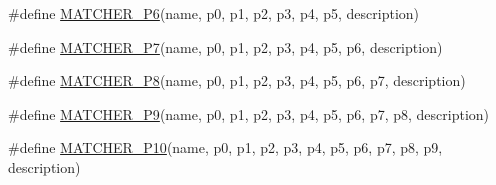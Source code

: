 \begin{DoxyCompactItemize}
\item 
\#define \mbox{\hyperlink{_obj__test_2lib_2googletest-release-1_88_81_2googlemock_2include_2gmock_2gmock-generated-matchers_8h_aceda758bb064965b2b9a7e0e96085861}{M\+A\+T\+C\+H\+E\+R\+\_\+\+P6}}(name,  p0,  p1,  p2,  p3,  p4,  p5,  description)
\item 
\#define \mbox{\hyperlink{_obj__test_2lib_2googletest-release-1_88_81_2googlemock_2include_2gmock_2gmock-generated-matchers_8h_a2948ce54387a83c33fa98ba0c73eb11f}{M\+A\+T\+C\+H\+E\+R\+\_\+\+P7}}(name,  p0,  p1,  p2,  p3,  p4,  p5,  p6,  description)
\item 
\#define \mbox{\hyperlink{_obj__test_2lib_2googletest-release-1_88_81_2googlemock_2include_2gmock_2gmock-generated-matchers_8h_ad86c95b03df37fada38e18d8eb9e53bc}{M\+A\+T\+C\+H\+E\+R\+\_\+\+P8}}(name,  p0,  p1,  p2,  p3,  p4,  p5,  p6,  p7,  description)
\item 
\#define \mbox{\hyperlink{_obj__test_2lib_2googletest-release-1_88_81_2googlemock_2include_2gmock_2gmock-generated-matchers_8h_a2dc1db146d4112c9fde1c2708807e43e}{M\+A\+T\+C\+H\+E\+R\+\_\+\+P9}}(name,  p0,  p1,  p2,  p3,  p4,  p5,  p6,  p7,  p8,  description)
\item 
\#define \mbox{\hyperlink{_obj__test_2lib_2googletest-release-1_88_81_2googlemock_2include_2gmock_2gmock-generated-matchers_8h_aa6a3925eeb8bcb4b6b3465cc4ff26650}{M\+A\+T\+C\+H\+E\+R\+\_\+\+P10}}(name,  p0,  p1,  p2,  p3,  p4,  p5,  p6,  p7,  p8,  p9,  description)
\end{DoxyCompactItemize}
